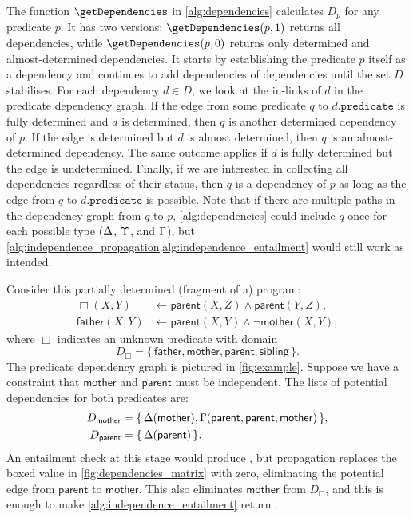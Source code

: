 The function $\getDependencies$ in \cref{alg:dependencies} calculates $D_p$ for
any predicate $p$. It has two versions: $\getDependencies(p, 1)$ returns all
dependencies, while $\getDependencies(p, 0)$ returns only determined and
almost-determined dependencies. It starts by establishing the predicate $p$
itself as a dependency and continues to add dependencies of dependencies until
the set $D$ stabilises. For each dependency $d \in D$, we look at the in-links
of $d$ in the predicate dependency graph. If the edge from some predicate $q$ to
$d.\mathtt{predicate}$ is fully determined and $d$ is determined, then $q$ is
another determined dependency of $p$. If the edge is determined but $d$ is
almost determined, then $q$ is an almost-determined dependency. The same outcome
applies if $d$ is fully determined but the edge is undetermined. Finally, if we
are interested in collecting all dependencies regardless of their status, then
$q$ is a dependency of $p$ as long as the edge from $q$ to
$d.\mathtt{predicate}$ is possible. Note that if there are multiple paths in the
dependency graph from $q$ to $p$, \cref{alg:dependencies} could include $q$ once
for each possible type ($\operatorname{\Delta}$, $\operatorname{\Upsilon}$, and
$\operatorname{\Gamma}$), but
\cref{alg:independence_propagation,alg:independence_entailment} would still work
as intended.

\begin{example}\label{example:independence}
  Consider this partially determined (fragment of a) program:
  \begin{align*}
    \Box(X, Y) &\gets \mathsf{parent}(X, Z) \land \mathsf{parent}(Y, Z),\\
    \mathsf{father}(X, Y) &\gets \mathsf{parent}(X, Y) \land \neg\mathsf{mother}(X, Y),
  \end{align*}
  where $\Box$ indicates an unknown predicate with domain
  \[
    D_\Box = \{\, \mathsf{father}, \mathsf{mother}, \mathsf{parent}, \mathsf{sibling} \,\}.
  \]
  The predicate dependency graph is pictured in \cref{fig:example}. Suppose we
  have a constraint that $\mathsf{mother}$ and $\mathsf{parent}$ must be
  independent. The lists of potential dependencies for both predicates are:
  \begin{align*}
    D_{\mathsf{mother}} &= \{\, \operatorname{\Delta}(\mathsf{mother}), \operatorname{\Gamma}(\mathsf{parent}, \mathsf{parent}, \mathsf{mother}) \,\}, \\
    D_{\mathsf{parent}} &= \{\, \operatorname{\Delta}(\mathsf{parent}) \,\}.
  \end{align*}
  An entailment check at this stage would produce \undefined{}, but propagation
  replaces the boxed value in \cref{fig:dependencies_matrix} with zero,
  eliminating the potential edge from $\mathsf{parent}$ to $\mathsf{mother}$.
  This also eliminates $\mathsf{mother}$ from $D_\Box$, and this is enough to
  make \cref{alg:independence_entailment} return \true{}.
\end{example}

